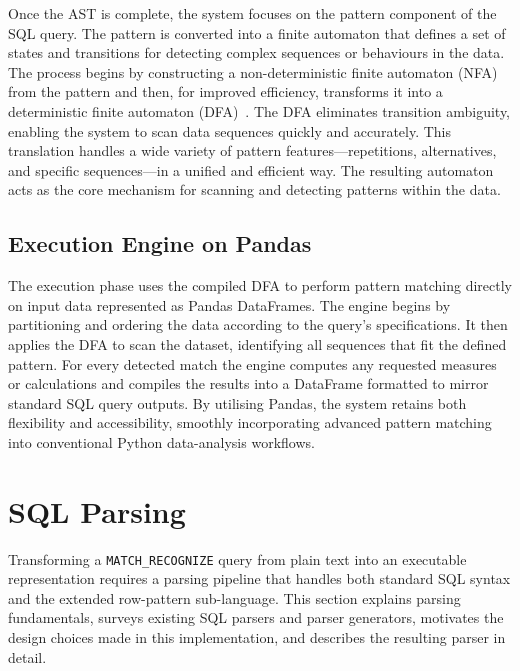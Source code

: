 Once the AST is complete, the system focuses on the pattern
component of the SQL query.  The pattern is converted into a finite
automaton that defines a set of states and transitions for detecting
complex sequences or behaviours in the data.  The process begins by
constructing a non-deterministic finite automaton (NFA) from the
pattern and then, for improved efficiency, transforms it into a
deterministic finite automaton
(DFA)~\cite{georgiou2025streaming}.  The DFA eliminates transition
ambiguity, enabling the system to scan data sequences quickly and
accurately.  This translation handles a wide variety of pattern
features---repetitions, alternatives, and specific sequences---in a
unified and efficient way.  The resulting automaton acts as the core
mechanism for scanning and detecting patterns within the data.

\subsection{Execution Engine on Pandas}
\label{subsec:overview-execution}

The execution phase uses the compiled DFA to perform pattern
matching directly on input data represented as Pandas DataFrames.
The engine begins by partitioning and ordering the data according to
the query's specifications.  It then applies the DFA to scan the
dataset, identifying all sequences that fit the defined pattern.
For every detected match the engine computes any requested measures
or calculations and compiles the results into a DataFrame formatted
to mirror standard SQL query outputs.  By utilising Pandas, the
system retains both flexibility and accessibility, smoothly
incorporating advanced pattern matching into conventional Python
data-analysis workflows.

\section{SQL Parsing}
\label{sec:meth-compiler}

Transforming a \texttt{MATCH\_RECOGNIZE} query from plain text into
an executable representation requires a parsing pipeline that
handles both standard SQL syntax and the extended row-pattern
sub-language.  This section explains parsing fundamentals, surveys
existing SQL parsers and parser generators, motivates the design
choices made in this implementation, and describes the resulting
parser in detail.

